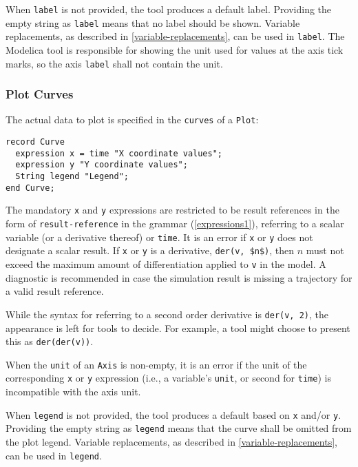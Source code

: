 When \lstinline!label! is not provided, the tool produces a default label.
Providing the empty string as \lstinline!label! means that no label should be shown.
Variable replacements, as described in \cref{variable-replacements}, can be used in \lstinline!label!.
The Modelica tool is responsible for showing the unit used for values at the axis tick marks, so the axis \lstinline!label! shall not contain the unit.

\subsubsection{Plot Curves}\label{plot-curves}

The actual data to plot is specified in the \lstinline!curves! of a \lstinline!Plot!:
\begin{lstlisting}[language=modelica]
record Curve
  expression x = time "X coordinate values";
  expression y "Y coordinate values";
  String legend "Legend";
end Curve;
\end{lstlisting}

The mandatory \lstinline!x! and \lstinline!y! expressions are restricted to be result references in the form of \lstinline[language=grammar]!result-reference! in the grammar (\cref{expressions1}), referring to a scalar variable (or a derivative thereof) or \lstinline!time!.
It is an error if \lstinline!x! or \lstinline!y! does not designate a scalar result.
If \lstinline!x! or \lstinline!y! is a derivative, \lstinline!der(v, $n$)!, then $n$ must not exceed the maximum amount of differentiation applied to \lstinline!v! in the model.
A diagnostic is recommended in case the simulation result is missing a trajectory for a valid result reference.

\begin{nonnormative}
While the syntax for referring to a second order derivative is \lstinline!der(v, 2)!, the appearance is left for tools to decide.
For example, a tool might choose to present this as \lstinline!der(der(v))!.
\end{nonnormative}

When the \lstinline!unit! of an \lstinline!Axis! is non-empty, it is an error if the unit of the corresponding \lstinline!x! or \lstinline!y! expression (i.e., a variable's \lstinline!unit!, or second for \lstinline!time!) is incompatible with the axis unit.

When \lstinline!legend! is not provided, the tool produces a default based on \lstinline!x! and/or \lstinline!y!.
Providing the empty string as \lstinline!legend! means that the curve shall be omitted from the plot legend.
Variable replacements, as described in \cref{variable-replacements}, can be used in \lstinline!legend!.

